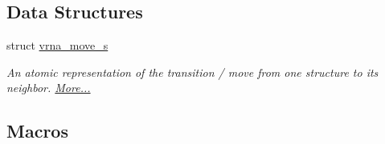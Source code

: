\subsection*{Data Structures}
\begin{DoxyCompactItemize}
\item 
struct \hyperlink{group__neighbors_structvrna__move__s}{vrna\+\_\+move\+\_\+s}
\begin{DoxyCompactList}\small\item\em An atomic representation of the transition / move from one structure to its neighbor.  \hyperlink{group__neighbors_structvrna__move__s}{More...}\end{DoxyCompactList}\end{DoxyCompactItemize}
\subsection*{Macros}
